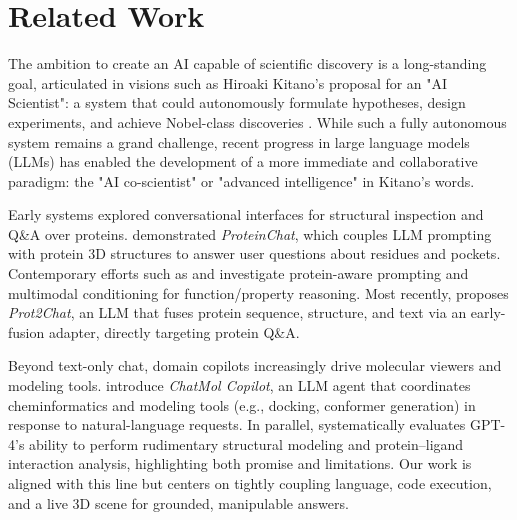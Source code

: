 \documentclass{article}
\begin{document}

\section{Related Work}\label{sec:related}
The ambition to create an AI capable of scientific discovery is a long-standing goal, articulated in visions such as Hiroaki Kitano's proposal for an "AI Scientist": a system that could autonomously formulate hypotheses, design experiments, and achieve Nobel-class discoveries \citep{kitano2021}. While such a fully autonomous system \citep{boiko2023autonomous, zou2025agente} remains a grand challenge, recent progress in large language models (LLMs) has enabled the development of a more immediate and collaborative paradigm: the "AI co-scientist" or "advanced intelligence" in Kitano's words. 

Early systems explored conversational interfaces for structural inspection and Q\&A over proteins. \citet{guo2023proteinchat} demonstrated \emph{ProteinChat}, which couples LLM prompting with protein 3D structures to answer user questions about residues and pockets. Contemporary efforts such as \citet{wang2024protchatgpt} and \citet{xiao2024proteingpt} investigate protein-aware prompting and multimodal conditioning for function/property reasoning. Most recently, \citet{wang2025prot2chat} proposes \emph{Prot2Chat}, an LLM that fuses protein sequence, structure, and text via an early-fusion adapter, directly targeting protein Q\&A.

Beyond text-only chat, domain copilots increasingly drive molecular viewers and modeling tools. \citet{sun2024chatmol} introduce \emph{ChatMol Copilot}, an LLM agent that coordinates cheminformatics and modeling tools (e.g., docking, conformer generation) in response to natural-language requests. In parallel, \citet{ille2024gpt4structural} systematically evaluates GPT-4’s ability to perform rudimentary structural modeling and protein–ligand interaction analysis, highlighting both promise and limitations. Our work is aligned with this line but centers on tightly coupling language, code execution, and a live 3D scene for grounded, manipulable answers.
\end{document}
